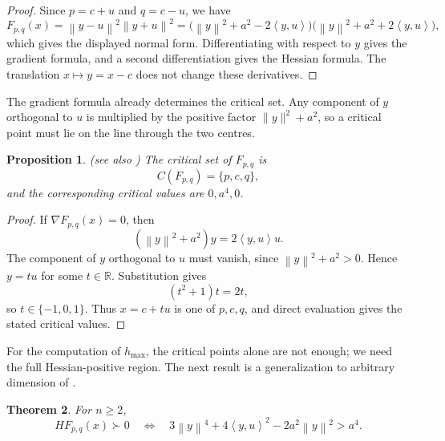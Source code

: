 \documentclass[10pt,a4paper]{amsart}
\newtheorem{theorem}{Theorem}[section]
\newtheorem{proposition}[theorem]{Proposition}
\newcommand{\R}{\mathbb{R}}
\newcommand{\ip}[2]{\left\langle #1,#2\right\rangle}
\newcommand{\norm}[1]{\left\lVert #1\right\rVert}
\begin{document}
\begin{proof}
Since $p=c+u$ and $q=c-u$, we have
\[
 F_{p,q}(x)=\norm{y-u}^2\norm{y+u}^2
 =\bigl(\norm{y}^2+a^2-2\ip{y}{u}\bigr)
  \bigl(\norm{y}^2+a^2+2\ip{y}{u}\bigr),
\]
which gives the displayed normal form. Differentiating with respect to $y$
gives the gradient formula, and a second differentiation gives the Hessian
formula. The translation $x\mapsto y=x-c$ does not change these derivatives.
\end{proof}

The gradient formula already determines the critical set.  Any component of
\(y\) orthogonal to \(u\) is multiplied by the positive factor
\(\|y\|^2+a^2\), so a critical point must lie on the line through the two
centres.

\begin{proposition}\label{prop:two-centre-critical-set}(see also \cite[Example 2.1]{BrojbeanuPintea-JCA})
The critical set of $F_{p,q}$ is
\[
 C(F_{p,q})=\{p,c,q\},
\]
and the corresponding critical values are $0,a^4,0$.
\end{proposition}

\begin{proof}
If $\nabla F_{p,q}(x)=0$, then
\[
 (\norm{y}^2+a^2)y=2\ip{y}{u}u.
\]
The component of $y$ orthogonal to $u$ must vanish, since
$\norm{y}^2+a^2>0$. Hence $y=tu$ for some $t\in\R$. Substitution gives
\[
 (t^2+1)t=2t,
\]
so $t\in\{-1,0,1\}$. Thus $x=c+tu$ is one of $p,c,q$, and direct evaluation
gives the stated critical values.
\end{proof}

For the computation of \(h_{\max}\), the critical points alone are not
enough; we need the full Hessian-positive region. The next result is a generalization to arbitrary dimension of \cite[Remark 3.2]{BrojbeanuPintea-JCA}. 


\begin{theorem}\label{thm:two-centre-hess-region}
For $n\ge2$,
\[
 HF_{p,q}(x)\succ0
 \quad\Longleftrightarrow\quad
 3\norm{y}^4+4\ip{y}{u}^2-2a^2\norm{y}^2>a^4.
\]
\end{theorem}
\end{document}
